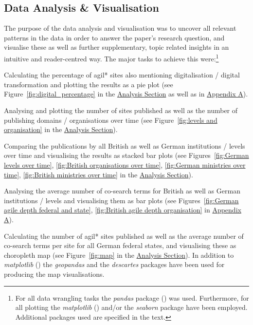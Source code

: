 \subsection{Data Analysis \& Visualisation}
The purpose of the data analysis and visualisation was to uncover all relevant patterns in the data in order to answer the paper's research question, and visualise these as well as further supplementary, topic related insights in an intuitive and reader-centred way. The major tasks to achieve this were:\footnote{For all data wrangling tasks the \textit{pandas} package (\cite{McKinney2010}) was used. Furthermore, for all plotting the \textit{matplotlib} (\cite{Hunter2007}) and/or the \textit{seaborn} package \parencite{Waskom2012} have been employed. Additional packages used are specified in the text.}
\begin{compactitem}
\item Calculating the percentage of agil* sites also mentioning digitalisation / digital transformation and plotting the results as a pie plot (see Figure~\ref{fig:digital_percentage} in the \href{Analysis}{Analysis Section} as well as in \href{Appendix A}{Appendix A}).
\item Analysing and plotting the number of sites published as well as the number of publishing domains / organisations over time (see Figure~\ref{fig:levels and organisation} in the \href{Analysis}{Analysis Section}). 
\item Comparing the publications by all British as well as German institutions / levels over time and visualising the results as stacked bar plots (see Figures~\ref{fig:German levels over time}, \ref{fig:British organisations over time}, \ref{fig:German ministries over time}, \ref{fig:British ministries over time} in the \href{Analysis}{Analysis Section}).
\item Analysing the average number of co-search terms for British as well as German institutions / levels and visualising them as bar plots (see Figures~\ref{fig:German agile depth federal and state}, \ref{fig:British agile depth organisation} in \href{Appendix A}{Appendix A}).
\item Calculating the number of agil* sites published as well as the average number of co-search terms per site for all German federal states, and visualising these as choropleth map (see Figure~\ref{fig:map} in the \href{Analysis}{Analysis Section}). In addition to \textit{matplotlib} (\cite{Hunter2007}) the \textit{geopandas} \parencite{GeoPandasDevelopers2013} and the \textit{descartes} \parencite{Gillies2020} packages have been used for producing the map visualisations.

\end{compactitem}
